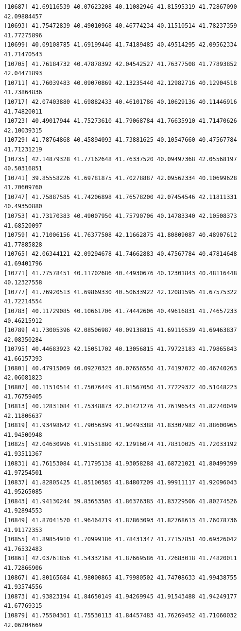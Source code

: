 \documentclass[
  letterpaper,
  DIV=11,
  numbers=noendperiod]{scrartcl}
\begin{document}
\begin{verbatim}
[10687] 41.69116539 40.07623208 40.11082946 41.81595319 41.72867090 42.09884457
[10693] 41.75472839 40.49010968 40.46774234 40.11510514 41.78237359 41.77275896
[10699] 40.09108785 41.69199446 41.74189485 40.49514295 42.09562334 41.71470543
[10705] 41.76184732 40.47878392 42.04542527 41.76377508 41.77893852 42.04471893
[10711] 41.76039483 40.09070869 42.13235440 42.12982716 40.12904518 41.73864836
[10717] 42.07403880 41.69882433 40.46101786 40.10629136 40.11446916 41.74820011
[10723] 40.49017944 41.75273610 41.79068784 41.76635910 41.71470626 42.10039315
[10729] 41.78764868 40.45894093 41.73881625 40.10547660 40.47567784 41.71231219
[10735] 42.14879328 41.77162648 41.76337520 40.09497368 42.05568197 40.50316851
[10741] 39.85558226 41.69781875 41.70278887 42.09562334 40.10699628 41.70609760
[10747] 41.75887585 41.74206898 41.76578200 42.07454546 42.11811331 40.49350880
[10753] 41.73170383 40.49007950 41.75790706 40.14783340 42.10508373 41.68520097
[10759] 41.71006156 41.76377508 42.11662875 41.80809087 40.48907612 41.77885828
[10765] 42.06344121 42.09294678 41.74662883 40.47567784 40.47814648 41.69401796
[10771] 41.77578451 40.11702686 40.44930676 40.12301843 40.48116448 40.12327558
[10777] 41.76920513 41.69869330 40.50633922 42.12081595 41.67575322 41.72214554
[10783] 40.11729085 40.10661706 41.74442606 40.49616831 41.74657233 40.46215912
[10789] 41.73005396 42.08506987 40.09138815 41.69116539 41.69463837 42.08350284
[10795] 40.44683923 42.15051702 40.13056815 41.79723183 41.79865843 41.66157393
[10801] 40.47915069 40.09270323 40.07656550 41.74197072 40.46740263 42.06081823
[10807] 40.11510514 41.75076449 41.81567050 41.77229372 40.51048223 41.76759405
[10813] 40.12831084 41.75348873 42.01421276 41.76196543 41.82740049 42.11806637
[10819] 41.93498642 41.79056399 41.90493388 41.83307982 41.88600965 41.94500948
[10825] 42.04630996 41.91531880 42.12916074 41.78310025 41.72033192 41.93511367
[10831] 41.76153084 41.71795138 41.93058288 41.68721021 41.80499399 41.97254501
[10837] 41.82805425 41.85100585 41.84807209 41.99911117 41.92096043 41.95265085
[10843] 41.94130244 39.83653505 41.86376385 41.83729506 41.80274526 41.92894553
[10849] 41.87041570 41.96464719 41.87863093 41.82768613 41.76078736 41.91172353
[10855] 41.89854910 41.70999186 41.78431347 41.77157851 40.69326042 41.76532483
[10861] 42.03761856 41.54332168 41.87669586 41.72683018 41.74820011 41.72866906
[10867] 41.80165684 41.98000865 41.79980502 41.74708633 41.99438755 41.93574556
[10873] 41.93823194 41.84650149 41.94269945 41.91543488 41.94249177 41.67769315
[10879] 41.75504301 41.75530113 41.84457483 41.76269452 41.71060032 42.06204669

\end{verbatim}
\end{document}
